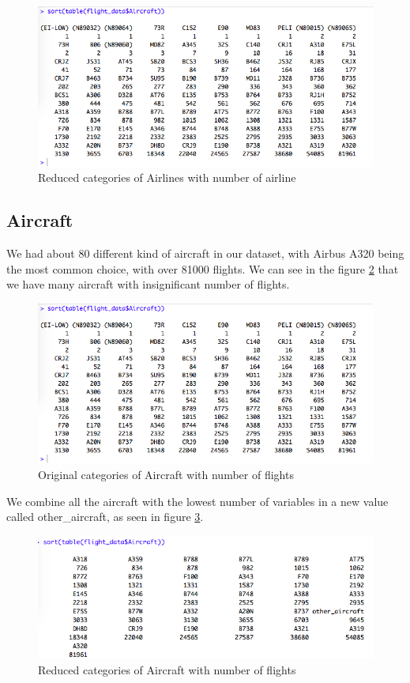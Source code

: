 \begin{figure}[ht]
    \centering
    \includegraphics[width=\textwidth]{Figures/Aircraft_orig_levels.png}
    \caption{Reduced categories of Airlines with number of airline}
    \label{fig:airline2}
\end{figure}

\subsection{Aircraft}
We had about 80 different kind of aircraft in our dataset, with Airbus A320 being the most common choice, with over 81000 flights. We can see in the figure \ref{fig:aircraft1} that we have many aircraft with insignificant number of flights.

\begin{figure}[ht]
    \centering
    \includegraphics[width=\textwidth]{Figures/Aircraft_orig_levels.png}
    \caption{Original categories of Aircraft with number of flights}
    \label{fig:aircraft1}
\end{figure}

We combine all the aircraft with the lowest number of variables in a new value called other\_aircraft, as seen in figure \ref{fig:aircraft2}.

\begin{figure}[ht]
    \centering
    \includegraphics[width=\textwidth]{Figures/Aircraft_reduced_levels.png}
    \caption{Reduced categories of Aircraft with number of flights}
    \label{fig:aircraft2}
\end{figure}

